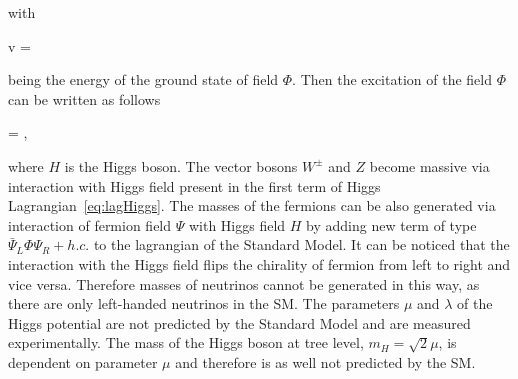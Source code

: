 with

{
v = 
}

being the energy of the ground state of field $\Phi$. Then the excitation of the field $\Phi$ can be written as follows

{
    \Phi = ,
}

where $H$ is the Higgs boson. The vector bosons $W^{\pm}$ and $Z$ become massive via interaction with Higgs field present in the first term of Higgs Lagrangian~\ref{eq:lagHiggs}. The masses of the fermions can be also generated via interaction of fermion field  $\Psi$ with Higgs field $H$ by adding new term of type $\bar{\Psi}_{L} \Phi \Psi_{R} + h.c.$ to the lagrangian of the Standard Model. It can be noticed that the interaction with the Higgs field flips the chirality of fermion from left to right and vice versa. Therefore masses of neutrinos cannot be generated in this way, as there are only left-handed neutrinos in the SM. The parameters $\mu$ and $\lambda$ of the Higgs potential are not predicted by the Standard Model and are measured experimentally. The mass of the Higgs boson at tree level, $m_{H} = \sqrt{2}\mu$, is dependent on parameter $\mu$ and therefore is as well not predicted by the SM. 


